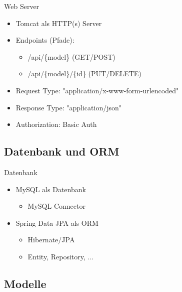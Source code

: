 \documentclass{beamer}
\begin{document}
\begin{frame}{Web Server}
  
  \begin{itemize}
    \item Tomcat als HTTP(s) Server
    \item Endpoints (Pfade):
          \begin{itemize}
            \item /api/\{model\} \hspace{10mm} (GET/POST)
            \item /api/\{model\}/\{id\} \hspace{2mm} (PUT/DELETE)
          \end{itemize}
    \item Request Type: "application/x-www-form-urlencoded"
    \item Response Type: "application/json"
    \item Authorization: Basic Auth
  \end{itemize}
  
\end{frame}


\subsection{Datenbank und ORM}

\begin{frame}{Datenbank}
  
  \begin{itemize}
    \item MySQL als Datenbank
          \begin{itemize}
            \item MySQL Connector
          \end{itemize}
    \item Spring Data JPA als ORM
          \begin{itemize}
            \item Hibernate/JPA
            \item Entity, Repository, ...
          \end{itemize}
  \end{itemize}
  
\end{frame}

\subsection{Modelle}
\end{document}
